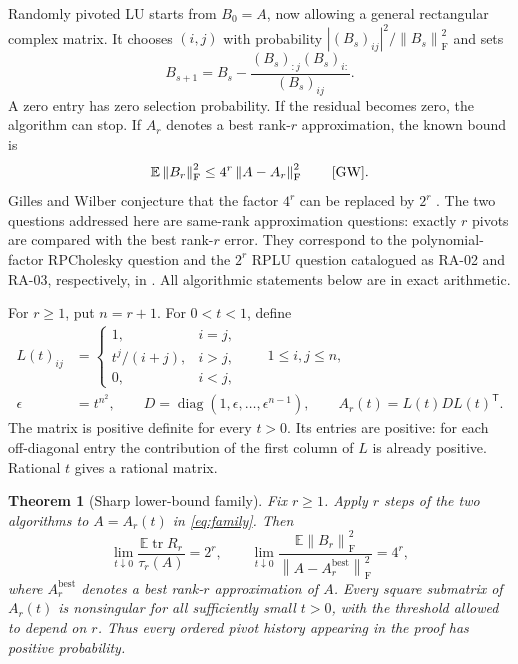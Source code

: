 \documentclass[11pt]{article}
\newtheorem{theorem}{Theorem}
\theoremstyle{remark}
\DeclareMathOperator{\tr}{tr}
\DeclareMathOperator{\diag}{diag}
\newcommand{\E}{\mathbb E}
\newcommand{\F}{\mathrm F}
\newcommand{\eps}{\epsilon}
\newcommand{\norm}[1]{\left\lVert#1\right\rVert}
\begin{document}
Randomly pivoted LU starts from $B_0=A$, now allowing a general rectangular
complex matrix. It chooses $(i,j)$ with probability
$|(B_s)_{ij}|^2/\norm{B_s}_{\F}^2$ and sets
\begin{equation}\label{eq:lu-update}
 B_{s+1}=B_s-\frac{(B_s)_{:j}(B_s)_{i:}}{(B_s)_{ij}}.
\end{equation}
A zero entry has zero selection probability. If the residual becomes zero,
the algorithm can stop. If $A_r$ denotes a best rank-$r$ approximation, the
known bound is
\begin{equation}\label{eq:known-lu}
 \E\norm{B_r}_{\F}^2\le4^r\norm{A-A_r}_{\F}^2
 \qquad\text{\cite[Theorem 3]{GW}}.
\end{equation}
Gilles and Wilber conjecture that the factor $4^r$ can be replaced by $2^r$
\cite[discussion after Theorem 3]{GW}. The two questions addressed here are
same-rank approximation questions: exactly $r$ pivots are compared with the
best rank-$r$ error. They correspond to the polynomial-factor RPCholesky
question and the $2^r$ RPLU question catalogued as RA-02 and RA-03,
respectively, in \cite{REPO}. All algorithmic statements below are in exact
arithmetic.

For $r\ge1$, put $n=r+1$. For $0<t<1$, define
\begin{equation}\label{eq:family}
 \begin{split}
 L(t)_{ij}&=
 \begin{cases}
  1,&i=j,\\
  t^j/(i+j),&i>j,\\
  0,&i<j,
 \end{cases}\qquad 1\le i,j\le n,\\
 \eps&=t^{n^2},\qquad
 D=\diag(1,\eps,\ldots,\eps^{n-1}),\qquad
 A_r(t)=L(t)D L(t)^{\mathsf T}.
 \end{split}
\end{equation}
The matrix is positive definite for every $t>0$. Its entries are positive:
for each off-diagonal entry the contribution of the first column of $L$ is
already positive. Rational $t$ gives a rational matrix.

\begin{theorem}[Sharp lower-bound family]\label{thm:main}
Fix $r\ge1$. Apply $r$ steps of the two algorithms to $A=A_r(t)$ in
\eqref{eq:family}. Then
\begin{equation}\label{eq:main-limits}
 \lim_{t\downarrow0}\frac{\E\tr R_r}{\tau_r(A)}=2^r,
 \qquad
 \lim_{t\downarrow0}\frac{\E\norm{B_r}_{\F}^2}
 {\norm{A-A_r^{\mathrm{best}}}_{\F}^2}=4^r,
\end{equation}
where $A_r^{\mathrm{best}}$ denotes a best rank-$r$ approximation of $A$.
Every square submatrix of $A_r(t)$ is nonsingular for all sufficiently small
$t>0$, with the threshold allowed to depend on $r$. Thus every ordered pivot
history appearing in the proof has positive probability.
\end{theorem}
\end{document}
